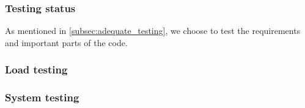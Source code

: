 \subsubsection{Testing status}
As mentioned in \cref{subsec:adequate_testing}, we choose to test the requirements and important parts of the code.


\subsubsection{Load testing}


\subsubsection{System testing}


